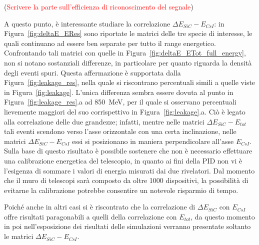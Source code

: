 (\textcolor{red}{Scrivere la parte sull'efficienza di riconoscimento del segnale})



A questo punto, è interessante studiare la correlazione $\Delta E_{SiC} - E_{CsI}$: in Figura~\ref{fig:deltaE_ERes} sono riportate le matrici delle tre specie di interesse, le quali continuano ad essere ben separate per tutto il range energetico. 
Confrontando tali matrici con quelle in Figura~\ref{fig:deltaE_ETot_full_energy}, non si notano sostanziali differenze, in particolare per quanto riguarda la densità degli eventi spuri.
Questa affermazione è supportata dalla Figura~\ref{fig:leakage_res}, nella quale si riscontrano percentuali simili a quelle viste in Figura~\ref{fig:leakage}.
L'unica differenza sembra essere dovuta al punto in Figura~\ref{fig:leakage_res}.a ad 850~MeV, per il quale si osservano percentuali lievemente maggiori del suo corrispettivo in Figura~\ref{fig:leakage}.a. 
Ciò è legato alla correlazione delle due grandezze;
infatti, mentre nelle matrici $\Delta E_{SiC} - E_{tot}$ tali eventi scendono verso l'asse orizzontale con una certa inclinazione, nelle matrici $\Delta E_{SiC} - E_{CsI}$ essi si posizionano in maniera perpendicolare all'asse $E_{CsI}$. 
Sulla base di questo risultato è possibile sostenere che non è necessario effettuare una calibrazione energetica del telescopio, in quanto ai fini della PID non vi è l'esigenza di sommare i valori di energia misurati dai due rivelatori.
Dal momento che il muro di telescopi sarà composto da oltre 1000 dispositivi, la possibilità di evitarne la calibrazione potrebbe consentire un notevole risparmio di tempo.

Poiché anche in altri casi si è riscontrato che la correlazione di $\Delta E_{SiC}$ con $E_{CsI}$ offre risultati paragonabili a quelli della correlazione con $E_{tot}$, da questo momento in poi nell'esposizione dei risultati delle simulazioni verranno presentate soltanto le matrici $\Delta E_{SiC} - E_{CsI}$.







